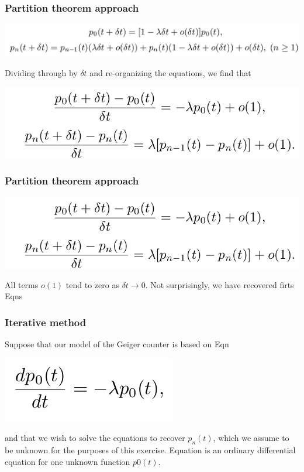 \documentclass[spanish]{beamer}
\begin{document}
\begin{frame}
\frametitle{Partition theorem approach}

\begin{center}
\includegraphics[scale=0.3]{im18}
\end{center}
Dividing through by $\delta t$ and re-organizing the equations, we find that

\begin{center}
\includegraphics[scale=0.4]{im19}
\end{center}
\end{frame}
\begin{frame}
\frametitle{Partition theorem approach}


\begin{center}
\includegraphics[scale=0.4]{im19}
\end{center}
All terms $o(1)$ tend to zero as $\delta t \rightarrow 0$. Not surprisingly, we have recovered firts Eqns 

\end{frame}
\begin{frame}
\frametitle{Iterative method}
Suppose that our model of the Geiger counter is based on Eqn


\begin{center}
\includegraphics[scale=0.4]{im20}
\end{center}

and that we wish to solve the equations to recover $p_n(t)$, which we assume to be unknown for the purposes of this exercise. Equation is an ordinary differential equation for
one unknown function $p 0 (t)$. 
\end{frame}
\end{document}
